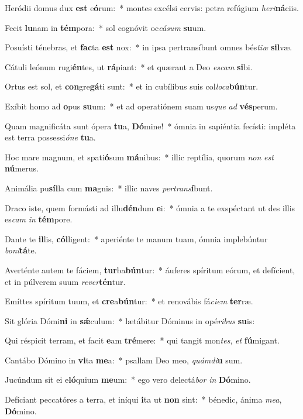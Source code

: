 \item Heródii domus dux \textbf{est} e\textbf{ó}rum:~* montes excélsi cervis: petra refúgium \textit{he}\textit{ri}\textbf{ná}ciis.
\item Fecit \textbf{lu}nam in \textbf{tém}pora:~* sol cognóvit oc\textit{cá}\textit{sum} \textbf{su}um.
\item Posuísti ténebras, et \textbf{fac}ta \textbf{est} nox:~* in ipsa pertransíbunt omnes bés\textit{ti}\textit{æ} \textbf{sil}væ.
\item Cátuli leónum rugi\textbf{én}tes, ut \textbf{rá}piant:~* et quærant a Deo \textit{es}\textit{cam} \textbf{si}bi.
\item Ortus est sol, et \textbf{con}gre\textbf{gá}ti sunt:~* et in cubílibus suis col\textit{lo}\textit{ca}\textbf{bún}tur.
\item Exíbit homo ad \textbf{o}pus \textbf{su}um:~* et ad operatiónem suam us\textit{que} \textit{ad} \textbf{vés}perum.
\item Quam magnificáta sunt ópera \textbf{tu}a, \textbf{Dó}mine!~* ómnia in sapiéntia fecísti: impléta est terra possessi\textit{ó}\textit{ne} \textbf{tu}a.
\item Hoc mare magnum, et spati\textbf{ó}sum \textbf{má}nibus:~* illic reptília, quorum \textit{non} \textit{est} \textbf{nú}merus.
\item Animália pu\textbf{síl}la cum \textbf{ma}gnis:~* illic naves \textit{per}\textit{trans}\textbf{í}bunt.
\item Draco iste, quem formásti ad illu\textbf{dén}dum \textbf{e}i:~* ómnia a te exspéctant ut des illis es\textit{cam} \textit{in} \textbf{tém}pore.
\item Dante te \textbf{il}lis, \textbf{cól}ligent:~* aperiénte te manum tuam, ómnia implebúntur \textit{bo}\textit{ni}\textbf{tá}te.
\item Averténte autem te fáciem, \textbf{tur}ba\textbf{bún}tur:~* áuferes spíritum eórum, et defícient, et in púlverem suum \textit{re}\textit{ver}\textbf{tén}tur.
\item Emíttes spíritum tuum, et \textbf{cre}a\textbf{bún}tur:~* et renovábis fá\textit{ci}\textit{em} \textbf{ter}ræ.
\item Sit glória Dómi\textbf{ni} in \textbf{sǽ}culum:~* lætábitur Dóminus in opé\textit{ri}\textit{bus} \textbf{su}is:
\item Qui réspicit terram, et facit \textbf{e}am \textbf{tré}mere:~* qui tangit mon\textit{tes}, \textit{et} \textbf{fú}migant.
\item Cantábo Dómino in \textbf{vi}ta \textbf{me}a:~* psallam Deo meo, \textit{quám}\textit{di}\textbf{u} sum.
\item Jucúndum sit ei e\textbf{ló}quium \textbf{me}um:~* ego vero delectá\textit{bor} \textit{in} \textbf{Dó}mino.
\item Defíciant peccatóres a terra, et iníqui \textbf{i}ta ut \textbf{non} sint:~* bénedic, ánima \textit{me}\textit{a}, \textbf{Dó}mino.

